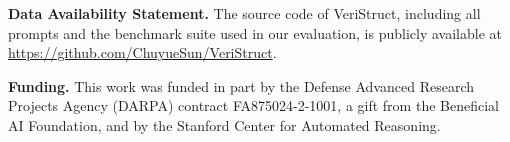 \documentclass[runningheads]{llncs}
\makeatletter
\newcommand{\toolname}[0]{{\sc VeriStruct}}
\newlength{\sectionspace}      \setlength{\sectionspace}{\p@}
\newlength{\subsectionspace}   \setlength{\subsectionspace}{\sectionspace}
\newlength{\subsubsectionspace}\setlength{\subsubsectionspace}{\subsectionspace}
\newlength{\paragraphspace}    \setlength{\paragraphspace}{\subsubsectionspace}
\renewcommand\paragraph{\@startsection{paragraph}{4}{\z@}%
                       {-12\paragraphspace \@plus -4\paragraphspace \@minus -4\paragraphspace}%
                       {-0.5em \@plus -0.22em \@minus -0.1em}%
                       {\normalfont\normalsize\itshape}}
\renewcommand{\paragraph}[1]{\medskip\noindent\textbf{#1.}}
\makeatother
\begin{document}





%
%





\paragraph{Data Availability Statement}
The source code of \toolname{}, including all prompts and the benchmark suite used in our evaluation, is publicly available at \url{https://github.com/ChuyueSun/VeriStruct}.

\paragraph{Funding}
This work was funded in part by the Defense Advanced Research Projects Agency (DARPA) contract FA875024-2-1001, a gift from the Beneficial AI Foundation, and by the Stanford Center for Automated Reasoning.

\FloatBarrier
\newpage



\newpage
\appendix

\end{document}
